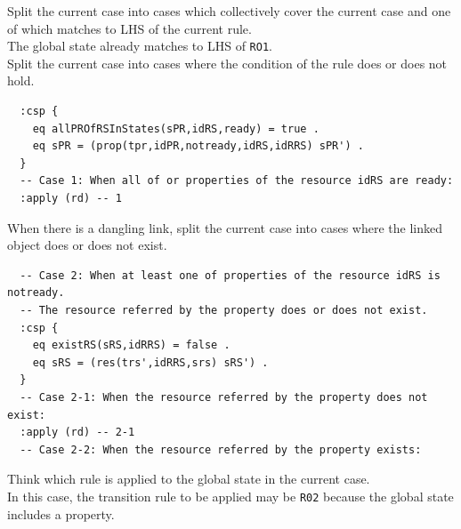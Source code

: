 \documentclass[12pt]{report}
\begin{document}
 Split the current case into cases which
collectively cover the current case and one of which matches to LHS of
the current rule. \\ 
The global state already matches to LHS of {\tt RO1}.\\

 Split the current case into cases where
the condition of the rule does or does not hold.
\small
\begin{verbatim}
  :csp { 
    eq allPROfRSInStates(sPR,idRS,ready) = true .
    eq sPR = (prop(tpr,idPR,notready,idRS,idRRS) sPR') .
  }
  -- Case 1: When all of or properties of the resource idRS are ready:
  :apply (rd) -- 1
\end{verbatim}
\normalsize
 When there is a dangling link, split the
current case into cases where the linked object does or does not
exist.
\small
\begin{verbatim}
  -- Case 2: When at least one of properties of the resource idRS is notready.
  -- The resource referred by the property does or does not exist.
  :csp {
    eq existRS(sRS,idRRS) = false .
    eq sRS = (res(trs',idRRS,srs) sRS') .
  }
  -- Case 2-1: When the resource referred by the property does not exist:
  :apply (rd) -- 2-1
  -- Case 2-2: When the resource referred by the property exists:
\end{verbatim}
\normalsize
 Think which rule is applied to the 
global state in the current case. \\
In this case, the transition rule to be applied may be {\tt R02} because the
global state includes a property.\\
\end{document}
